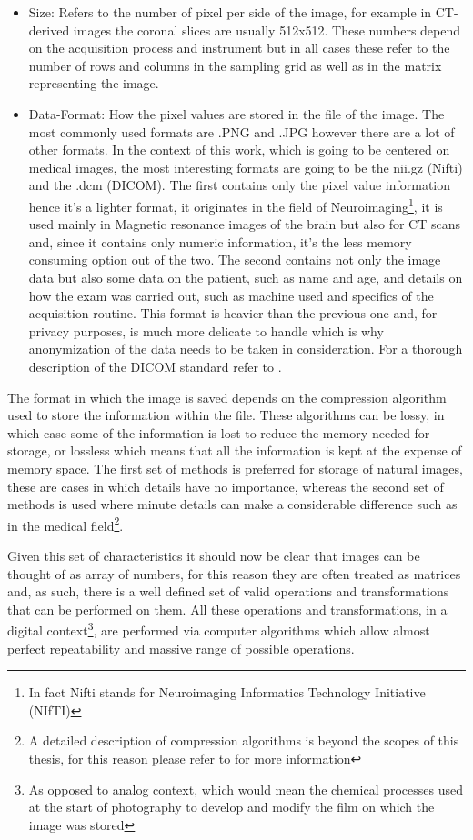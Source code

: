\begin{itemize}
\item Size: Refers to the number of pixel per side of the image, for example in CT-derived images the coronal slices are usually 512x512. These numbers depend on the acquisition process and instrument but in all cases these refer to the number of rows and columns in the sampling grid as well as in the matrix representing the image.
\item Data-Format: How the pixel values are stored in the file of the image. The most commonly used formats are .PNG and .JPG however there are a lot of other formats. In the context of this work, which is going to be centered on medical images, the most interesting formats are going to be the nii.gz (Nifti) and the .dcm (DICOM). The first contains only the pixel value information hence it's a lighter format, it originates in the field of Neuroimaging\footnote{In fact Nifti stands for Neuroimaging Informatics Technology Initiative (NIfTI)}, it is used mainly in Magnetic resonance images of the brain but also for CT scans and, since it contains only  numeric information, it's the less memory consuming option out of the two. The second contains not only the image data but also some data on the patient, such as name and age, and details on how the exam was carried out, such as machine used and specifics of the acquisition routine. This format is heavier than the previous one and, for privacy purposes, is much more delicate to handle which is why anonymization of the data needs to be taken in consideration. For a thorough description of the DICOM standard refer to \cite{DICOM}.
\end{itemize}

The format in which the image is saved depends on the compression algorithm used to store the information within the file. These algorithms can be lossy, in which case some of the information is lost to reduce the memory needed for storage, or lossless which means that all the information is kept at the expense of memory space. The first set of methods is preferred for storage of natural images, these are cases in which details have no importance, whereas the second set of methods is used where minute details can make a considerable difference such as in the medical field\footnote{A detailed description of compression algorithms is beyond the scopes of this thesis, for this reason please refer to \cite{Img_Compression} for more information}.

Given this set of characteristics it should now be clear that images can be thought of as array of numbers, for this reason they are often treated as matrices and, as such, there is a well defined set of valid operations and transformations that can be performed on them. All these operations and transformations, in a digital context\footnote{As opposed to analog context, which would mean the chemical processes used at the start of photography to develop and modify the film on which the image was stored}, are performed via computer algorithms which allow almost perfect repeatability and massive range of possible operations.

